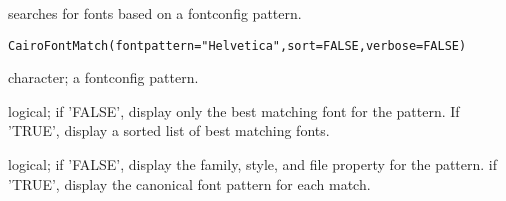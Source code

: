 \begin{Description}\relax
{} searches for fonts based on a fontconfig pattern.
\end{Description}
\begin{Usage}
\begin{verbatim}
CairoFontMatch(fontpattern="Helvetica",sort=FALSE,verbose=FALSE)
\end{verbatim}
\end{Usage}
\begin{Arguments}
\begin{ldescription}
\item[\code{fontpattern}] character; a fontconfig pattern.
\item[\code{sort}] logical; if 'FALSE', display only the best matching font for the pattern. If 'TRUE', display a sorted list of best matching fonts.
\item[\code{verbose}] logical; if 'FALSE', display the family, style, and file property for the pattern. if 'TRUE', display the canonical font pattern for each match.
\end{ldescription}
\end{Arguments}
